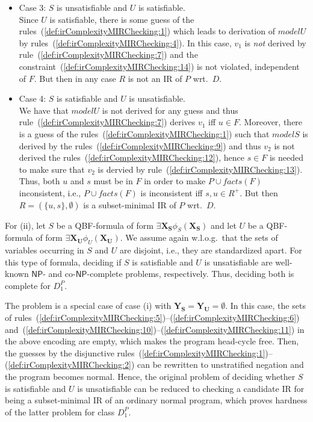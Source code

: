 \documentclass[11pt,fleqn,twoside]{article}
\renewcommand{\vec}[1]{\ensuremath{\mb{#1}}}
\newcommand{\mb}[1]{\ensuremath{\mathbf{#1}}}
\newcommand{\np}{\ensuremath{\mathsf{NP}}\xspace}
\newcommand{\conp}{co-\ensuremath{\mathsf{NP}}\xspace}
\newcommand{\toFacts}[1]{\mathit{facts}(#1)}
\begin{document}
{\begin{itemize}
							Thus, $R' = (\{u\}, \emptyset)$ is an IR of $P$ wrt.~$D$, which proves that $R$ is not subset-minimal.
						\item Case 3: $S$ is unsatisfiable and $U$ is satisfiable. \\
							Since $U$ is satisfiable, there is some guess of the rules~(\ref{def:irComplexityMIRChecking:1}) which leads to derivation of $\mathit{modelU}$ by rules~(\ref{def:irComplexityMIRChecking:4}).
							In this case, $v_1$ is \emph{not} derived by rule~(\ref{def:irComplexityMIRChecking:7}) and the constraint~(\ref{def:irComplexityMIRChecking:14}) is not violated, independent of $F$.
							But then in any case $R$ is not an IR of $P$ wrt.~$D$.
						\item Case 4: $S$ is satisfiable and $U$ is unsatisfiable. \\
							We have that $\mathit{modelU}$ is not derived for any guess and thus rule~(\ref{def:irComplexityMIRChecking:7}) derives $v_1$ iff $u \in F$.
							Moreover, there is a guess of the rules~(\ref{def:irComplexityMIRChecking:1})
							such that $\mathit{modelS}$ is derived by the rules~(\ref{def:irComplexityMIRChecking:9}) and thus $v_2$ is not derived the rules~(\ref{def:irComplexityMIRChecking:12}),
							hence $s \in F$ is needed to make sure that $v_2$ is dervied by rule~(\ref{def:irComplexityMIRChecking:13}).
							Thus, both $u$ and $s$ must be in $F$ in order to make $P \cup \toFacts{F}$ inconsistent,
							i.e., $P \cup \toFacts{F}$ is inconsistent iff $s, u \in R^{+}$.
							But then $R = (\{u, s\}, \emptyset)$ is a subset-minimal IR of $P$ wrt.~$D$.
					\end{itemize}

					For (ii), let $S$ be a QBF-formula of form $\exists \vec{X_S} \phi_S(\vec{X_S})$
					and let $U$ be a QBF-formula of form $\exists \vec{X_U} \phi_U(\vec{X_U})$.
					We assume again w.l.o.g.~that the sets of variables occurring in $S$ and $U$ are disjoint, i.e., they are standardized apart.
					For this type of formula, deciding if $S$ is satisfiable and $U$ is unsatisfiable are well-known \np- and \conp-complete problems, respectively.
					Thus, deciding both is complete for $D^P_1$.

					The problem is a special case of case (i) with $\vec{Y_S} = \vec{Y_U} = \emptyset$.
					In this case,
					the sets of rules~(\ref{def:irComplexityMIRChecking:5})--(\ref{def:irComplexityMIRChecking:6}) and~(\ref{def:irComplexityMIRChecking:10})--(\ref{def:irComplexityMIRChecking:11})
					in the above encoding are empty, which makes the program head-cycle free.
					Then, the guesses by the disjunctive rules~(\ref{def:irComplexityMIRChecking:1})--(\ref{def:irComplexityMIRChecking:2}) can be rewritten to unstratified negation
					and the program becomes normal.
					Hence, the original problem of deciding whether $S$ is satisfiable and $U$ is unsatisfiable can be reduced to checking a candidate IR for being a subset-minimal IR of an ordinary normal program,
					which proves hardness of the latter problem for class $D^P_1$.

}
\end{document}
